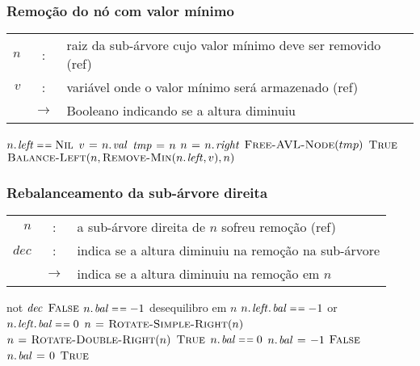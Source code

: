 \documentclass{beamer}
\begin{document}
\begin{frame}
\frametitle{Remoção do nó com valor mínimo}

\begin{tabular}{rcl}
$n$ & : & raiz da sub-árvore cujo valor mínimo deve ser removido (ref) \\
$v$ & : & variável onde o valor mínimo será armazenado (ref) \\
& $\rightarrow$ & Booleano indicando se a altura diminuiu
\end{tabular}

\begin{codebox}
\li \If $\attrib{n}{left} \isequal \const{Nil}$
\li \Then
      $v \gets \attrib{n}{val}$
\li   $\id{tmp} \gets n$
\li   $n \gets \attrib{n}{right}$
\li   $\textnormal{\scshape Free-AVL-Node}(tmp)$
\li   \Return $\textnormal{\scshape True}$
\li \Else
\li   \Return $\proc{Balance-Left}(n, \proc{Remove-Min}(\attrib{n}{left}, v), n)$
    \End  
\end{codebox}

\end{frame}

\begin{frame}
\frametitle{Rebalanceamento da sub-árvore direita}

\begin{small}
\begin{tabular}{rcl}
$n$ & : & a sub-árvore direita de $n$ sofreu remoção (ref) \\
$dec$ & : & indica se a altura diminuiu na remoção na sub-árvore \\
& $\rightarrow$ & indica se a altura diminuiu na remoção em $n$
\end{tabular}

\begin{codebox}
\li \If not $\id{dec}$
\li \Then \Return $\textnormal{\scshape False}$
    \End
\li \If $\attrib{n}{bal} \isequal -1$ \> \> \> \> \> \Comment desequilibro em $n$
\li \Then
      \If $\attrib{\attrib{n}{left}}{bal} \isequal -1$ or
          $\attrib{\attrib{n}{left}}{bal} \isequal 0$
\li   \Then
        $n \mathrel{\hspace{1pt}=\hspace{1pt}} \textnormal{\scshape Rotate-Simple-Right}(n)$
\li   \ElseNoIf 
        $n \mathrel{\hspace{1pt}=\hspace{1pt}} \textnormal{\scshape Rotate-Double-Right}(n)$
      \End
\li   \Return $\textnormal{\scshape True}$
\li \ElseIf $\attrib{n}{bal} \isequal 0$
\li \Then
      $\attrib{n}{bal} \gets -1$
\li   \Return $\textnormal{\scshape False}$
\li \ElseNoIf
      $\attrib{n}{bal} \gets 0$
\li   \Return $\textnormal{\scshape True}$
    \End
\end{codebox}
\end{small}

\end{frame}
\end{document}
